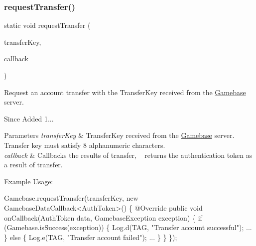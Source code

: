 \subsubsection{\texorpdfstring{request\+Transfer()}{requestTransfer()}}
{\footnotesize\ttfamily static void request\+Transfer (\begin{DoxyParamCaption}\item[{final String}]{transfer\+Key,  }\item[{final \hyperlink{interfacecom_1_1toast_1_1android_1_1gamebase_1_1_gamebase_data_callback}{Gamebase\+Data\+Callback}$<$ \hyperlink{classcom_1_1toast_1_1android_1_1gamebase_1_1auth_1_1data_1_1_auth_token}{Auth\+Token} $>$}]{callback }\end{DoxyParamCaption})\hspace{0.3cm}{\ttfamily [static]}}



Request an account transfer with the Transfer\+Key received from the \hyperlink{classcom_1_1toast_1_1android_1_1gamebase_1_1_gamebase}{Gamebase} server. 

\begin{DoxySince}{Since}
Added 1... 
\end{DoxySince}

\begin{DoxyParams}{Parameters}
{\em transfer\+Key} & Transfer\+Key received from the \hyperlink{classcom_1_1toast_1_1android_1_1gamebase_1_1_gamebase}{Gamebase} server. Transfer key must satisfy 8 alphanumeric characters. \\
\hline
{\em callback} & Callbacks the results of transfer, ~\newline
 returns the authentication token as a result of transfer.\\
\hline
\end{DoxyParams}
Example Usage\+: 
\begin{DoxyCode}
Gamebase.requestTransfer(transferKey, \textcolor{keyword}{new} GamebaseDataCallback<AuthToken>() \{
    @Override
    \textcolor{keyword}{public} \textcolor{keywordtype}{void} onCallback(AuthToken data, GamebaseException exception) \{
        \textcolor{keywordflow}{if} (Gamebase.isSuccess(exception)) \{
            Log.d(TAG, \textcolor{stringliteral}{"Transfer account successful"});
            ...
        \} \textcolor{keywordflow}{else} \{
            Log.e(TAG, \textcolor{stringliteral}{"Transfer account failed"});
            ...
        \}
    \}
\});
\end{DoxyCode}


